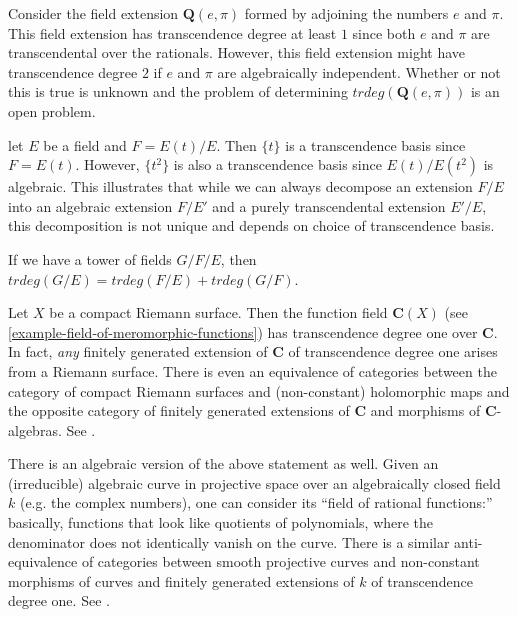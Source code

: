 \begin{example} Consider the field extension $\mathbf{Q}(e,\pi)$ formed by
adjoining the numbers $e$ and $\pi$. This field extension has transcendence
degree at least $1$ since both $e$ and $\pi$ are transcendental over the
rationals. However, this field extension might have transcendence degree $2$ if
$e$ and $\pi$ are algebraically independent. Whether or not this is true is
unknown and the problem of determining $trdeg(\mathbf{Q}(e,\pi))$ is an open
problem.\end{example}

\begin{example} let $E$ be a field and $F=E(t)/E$. Then $\{t\}$ is a
transcendence basis since $F=E(t)$. However, $\{t^2\}$ is also a transcendence
basis since $E(t)/E(t^2)$ is algebraic. This illustrates that while we can
always decompose an extension $F/E$ into an algebraic extension $F/E'$ and a
purely transcendental extension $E'/E$, this decomposition is not unique and
depends on choice of transcendence basis. \end{example}

\begin{exercise} If we have a tower of fields $G/F/E$, then
$trdeg(G/E)=trdeg(F/E)+trdeg(G/F)$. \end{exercise}

\begin{example}
Let $X$ be a compact Riemann surface. Then the function field $\mathbf{C}(X)$
(see \ref{example-field-of-meromorphic-functions}) has transcendence degree one over $\mathbf{C}$. In
fact, \emph{any} finitely generated extension of $\mathbf{C}$ of transcendence
degree one arises from a Riemann surface. There is even an equivalence of
categories between the category of compact Riemann surfaces and
(non-constant) holomorphic maps
and the opposite category of finitely generated extensions of $\mathbf{C}$ and
morphisms of $\mathbf{C}$-algebras. See \cite{Forster}.

There is an algebraic version of the above statement as well. Given an
(irreducible) algebraic curve in projective space over an algebraically
closed field $k$ (e.g. the complex numbers), one can consider its ``field of
rational
functions:'' basically, functions that look like quotients of polynomials,
where the denominator does not identically vanish on the curve.
There is a similar anti-equivalence of categories between smooth projective
curves and
non-constant morphisms of curves and finitely generated extensions of $k$ of
transcendence degree one. See \cite{H}.
\end{example}


